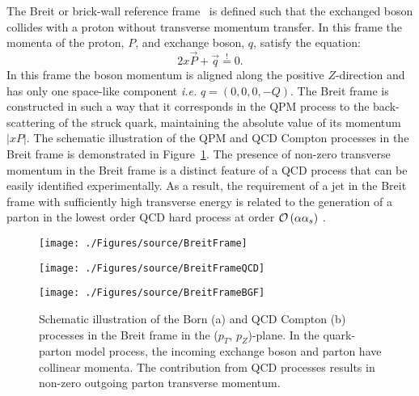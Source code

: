 The Breit or brick-wall reference frame~\cite{feynman:1972:photon,zfp:c2:237} is defined such that the exchanged boson collides with a proton without transverse momentum transfer. In this frame the momenta of the proton, $P$, and exchange boson, $q$, satisfy the equation:
\begin{equation}
2x\vec{P} + \vec{q} \stackrel{!}{=} 0.
\label{eq:breitframe}
\end{equation}
In this frame the boson momentum is aligned along the positive $Z$-direction and has only one space-like component \textit{i.e.} $q=\left( 0, 0, 0, -Q\right)$. The Breit frame is constructed in such a way that it corresponds in the QPM process to the back-scattering of the struck quark, maintaining the absolute value of its momentum $\left|xP\right|$. The schematic illustration of the QPM and QCD Compton processes in the Breit frame is demonstrated in Figure~\ref{fig:breitframe}. The presence of non-zero transverse momentum in the Breit frame is a distinct feature of a QCD process that can be easily identified experimentally. As a result, the requirement of a jet in the Breit frame with sufficiently high transverse energy is related to the generation of a parton in the lowest order QCD hard process at order $\mathcal{O}\left(\alpha\mbox{$\alpha_{s}$}\right)$ .
\begin{figure}
	\centering
	\begin{subfloat}[]{
		\texttt{[image: ./Figures/source/BreitFrame]}
		\label{fig:breitframeqpm}
	}%
	\end{subfloat}
	\begin{subfloat}[]{
		\texttt{[image: ./Figures/source/BreitFrameQCD]}
		\label{fig:breitframeqcd}
	}%
	\end{subfloat}
	\begin{subfloat}[]{
		\texttt{[image: ./Figures/source/BreitFrameBGF]}
		\label{fig:breitframeqcd}
	}%
	\end{subfloat}
	\caption{Schematic illustration of the Born (a) and QCD Compton (b) processes in the Breit frame in the ($p_T$, $p_Z$)-plane. In the quark-parton model process, the incoming exchange boson and parton have collinear momenta. The contribution from QCD processes results in non-zero outgoing parton transverse momentum.}
\label{fig:breitframe}
\end{figure}